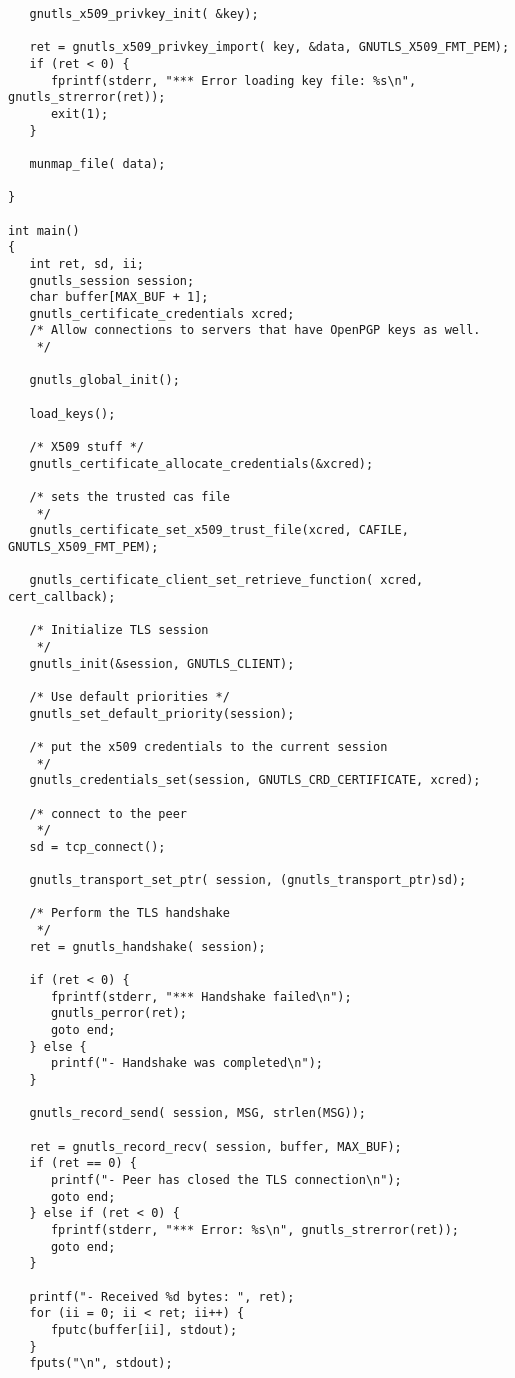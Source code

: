 \begin{verbatim}
   gnutls_x509_privkey_init( &key);
   
   ret = gnutls_x509_privkey_import( key, &data, GNUTLS_X509_FMT_PEM);
   if (ret < 0) {
      fprintf(stderr, "*** Error loading key file: %s\n", gnutls_strerror(ret));
      exit(1);
   }

   munmap_file( data);
   
}

int main()
{
   int ret, sd, ii;
   gnutls_session session;
   char buffer[MAX_BUF + 1];
   gnutls_certificate_credentials xcred;
   /* Allow connections to servers that have OpenPGP keys as well.
    */

   gnutls_global_init();

   load_keys();

   /* X509 stuff */
   gnutls_certificate_allocate_credentials(&xcred);

   /* sets the trusted cas file
    */
   gnutls_certificate_set_x509_trust_file(xcred, CAFILE, GNUTLS_X509_FMT_PEM);

   gnutls_certificate_client_set_retrieve_function( xcred, cert_callback);
   
   /* Initialize TLS session 
    */
   gnutls_init(&session, GNUTLS_CLIENT);

   /* Use default priorities */
   gnutls_set_default_priority(session);

   /* put the x509 credentials to the current session
    */
   gnutls_credentials_set(session, GNUTLS_CRD_CERTIFICATE, xcred);

   /* connect to the peer
    */
   sd = tcp_connect();

   gnutls_transport_set_ptr( session, (gnutls_transport_ptr)sd);

   /* Perform the TLS handshake
    */
   ret = gnutls_handshake( session);

   if (ret < 0) {
      fprintf(stderr, "*** Handshake failed\n");
      gnutls_perror(ret);
      goto end;
   } else {
      printf("- Handshake was completed\n");
   }

   gnutls_record_send( session, MSG, strlen(MSG));

   ret = gnutls_record_recv( session, buffer, MAX_BUF);
   if (ret == 0) {
      printf("- Peer has closed the TLS connection\n");
      goto end;
   } else if (ret < 0) {
      fprintf(stderr, "*** Error: %s\n", gnutls_strerror(ret));
      goto end;
   }

   printf("- Received %d bytes: ", ret);
   for (ii = 0; ii < ret; ii++) {
      fputc(buffer[ii], stdout);
   }
   fputs("\n", stdout);


\end{verbatim}
